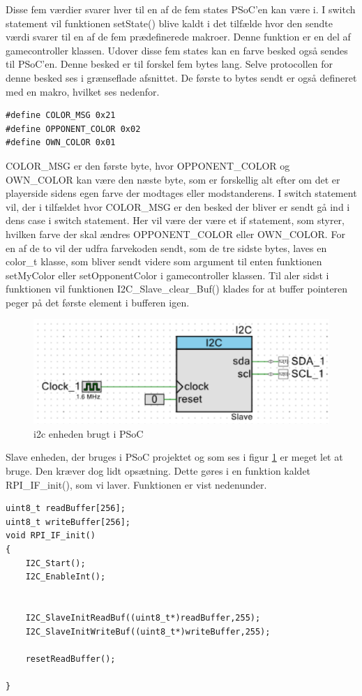 \documentclass[Softwaredesign/Softwaredesign_main.tex]{subfiles}
\begin{document}
Disse fem værdier svarer hver til en af de fem states PSoC'en kan være i. I switch statement vil funktionen setState() blive kaldt i det tilfælde hvor den sendte værdi svarer til en af de fem prædefinerede makroer. Denne funktion er en del af gamecontroller klassen. Udover disse fem states kan en farve besked også sendes til PSoC'en. Denne besked er til forskel fem bytes lang. Selve protocollen for denne besked ses i grænseflade afsnittet. De første to bytes sendt er også defineret med en makro, hvilket ses nedenfor. 
\begin{lstlisting}
#define COLOR_MSG 0x21
#define OPPONENT_COLOR 0x02
#define OWN_COLOR 0x01
\end{lstlisting}
COLOR\_MSG er den første byte, hvor OPPONENT\_COLOR og OWN\_COLOR kan være den næste byte, som er forskellig alt efter om det er playerside sidens egen farve der modtages eller modstanderens. I switch statement vil, der i tilfældet hvor COLOR\_MSG er den besked der bliver er sendt gå ind i dens case i switch statement. Her vil være der være et if statement, som styrer, hvilken farve der skal ændres OPPONENT\_COLOR eller OWN\_COLOR. For en af de to vil der udfra farvekoden sendt, som de tre sidste bytes, laves en  color\_t klasse, som bliver sendt videre som argument til enten funktionen setMyColor eller setOpponentColor i gamecontroller klassen. Til aler sidst i funktionen vil funktionen I2C\_Slave\_clear\_Buf() klades for at buffer pointeren peger på det første element i bufferen igen.
\begin{figure}[H]
    \centering
    \includegraphics[width=1\textwidth]{Softwaredesign/RPI_IF/graphics/i2c_enhed.PNG}
    \caption{i2c enheden brugt i PSoC}
    \label{fig:i2c_enhed}
\end{figure}
Slave enheden, der bruges i PSoC projektet og som ses i figur \ref{fig:i2c_enhed} er meget let at bruge. Den kræver dog lidt opsætning. Dette gøres i en funktion kaldet RPI\_IF\_init(), som vi laver. Funktionen er vist nedenunder.
\begin{lstlisting}
uint8_t readBuffer[256];
uint8_t writeBuffer[256];
void RPI_IF_init()
{
    I2C_Start();
    I2C_EnableInt();
    
    
    I2C_SlaveInitReadBuf((uint8_t*)readBuffer,255);
    I2C_SlaveInitWriteBuf((uint8_t*)writeBuffer,255);
    
    resetReadBuffer();

}
\end{lstlisting}
\end{document}
